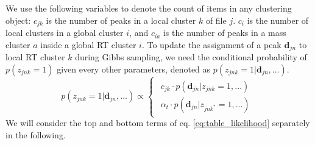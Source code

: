 We use the following variables to denote the count of items in any clustering object: $c_{jk}$ is the number of peaks in a local cluster $k$ of file $j$. $c_{i}$ is the number of local clusters in a global cluster $i$, and $c_{ia}$ is the number of peaks in a mass cluster $a$ inside a global RT cluster $i$. To update the assignment of a peak $\mathbf{d}_{jn}$ to local RT cluster $k$ during Gibbs sampling, we need the conditional probability of $p(z_{jnk}=1)$ given every other parameters, denoted as $p(z_{jnk}=1|\mathbf{d}_{jn},\ldots)$.
\begin{dmath}
p(z_{jnk}=1|\mathbf{d}_{jn},\ldots)\propto\begin{cases}
\begin{array}{c}
c_{jk}\cdot p(\mathbf{d}_{jn}|z_{jnk}=1,...)\\
\alpha_{t}\cdot p(\mathbf{d}_{jn}|z_{jnk^{*}}=1,...)
\end{array}\end{cases}\label{eq:table_likelihood}
\end{dmath}
We will consider the top and bottom terms of eq. \ref{eq:table_likelihood} separately in the following.
